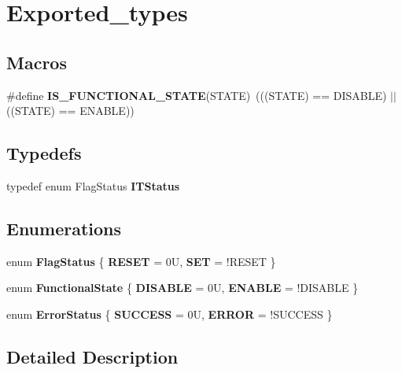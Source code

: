 \hypertarget{group___exported__types}{}\section{Exported\+\_\+types}
\label{group___exported__types}
\subsection*{Macros}
\begin{DoxyCompactItemize}
\item 
\mbox{\label{group___exported__types_gaffaf7c3f537d7a3370b1bbdda67a2bf6}} 
\#define {\bfseries I\+S\+\_\+\+F\+U\+N\+C\+T\+I\+O\+N\+A\+L\+\_\+\+S\+T\+A\+TE}(S\+T\+A\+TE)~(((S\+T\+A\+TE) == D\+I\+S\+A\+B\+LE) $\vert$$\vert$ ((S\+T\+A\+TE) == E\+N\+A\+B\+LE))
\end{DoxyCompactItemize}
\subsection*{Typedefs}
\begin{DoxyCompactItemize}
\item 
\mbox{\label{group___exported__types_gaacbd7ed539db0aacd973a0f6eca34074}} 
typedef enum Flag\+Status {\bfseries I\+T\+Status}
\end{DoxyCompactItemize}
\subsection*{Enumerations}
\begin{DoxyCompactItemize}
\item 
\mbox{\label{group___exported__types_ga89136caac2e14c55151f527ac02daaff}} 
enum {\bfseries Flag\+Status} \{ {\bfseries R\+E\+S\+ET} = 0U, 
{\bfseries S\+ET} = !\+R\+E\+S\+ET
 \}
\item 
\mbox{\label{group___exported__types_gac9a7e9a35d2513ec15c3b537aaa4fba1}} 
enum {\bfseries Functional\+State} \{ {\bfseries D\+I\+S\+A\+B\+LE} = 0U, 
{\bfseries E\+N\+A\+B\+LE} = !\+D\+I\+S\+A\+B\+LE
 \}
\item 
\mbox{\label{group___exported__types_ga8333b96c67f83cba354b3407fcbb6ee8}} 
enum {\bfseries Error\+Status} \{ {\bfseries S\+U\+C\+C\+E\+SS} = 0U, 
{\bfseries E\+R\+R\+OR} = !\+S\+U\+C\+C\+E\+SS
 \}
\end{DoxyCompactItemize}


\subsection{Detailed Description}
